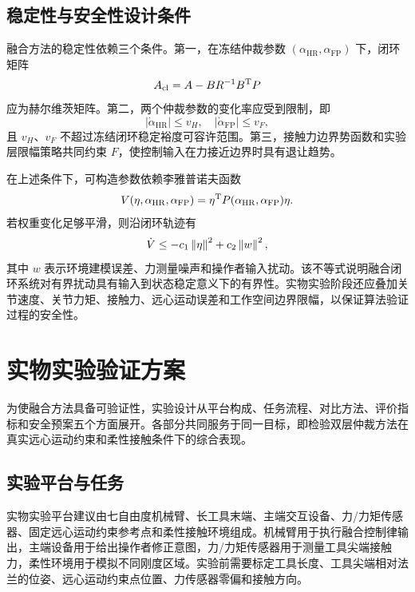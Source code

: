 \subsection{稳定性与安全性设计条件}
\label{sec:ch5_stability_safety}

融合方法的稳定性依赖三个条件。第一，在冻结仲裁参数 $(\alpha_{\mathrm{HR}},\alpha_{\mathrm{FP}})$ 下，闭环矩阵
\begin{equation}
  A_{\mathrm{cl}}=A-BR^{-1}B^{\mathrm{T}}P
  \label{eq:ch5_acl}
\end{equation}
应为赫尔维茨矩阵。第二，两个仲裁参数的变化率应受到限制，即
\begin{equation}
  |\dot\alpha_{\mathrm{HR}}|\le v_H,\quad |\dot\alpha_{\mathrm{FP}}|\le v_F,
  \label{eq:ch5_rate_bound}
\end{equation}
且 $v_H$、$v_F$ 不超过冻结闭环稳定裕度可容许范围。第三，接触力边界势函数和实验层限幅策略共同约束 $F$，使控制输入在力接近边界时具有退让趋势。

在上述条件下，可构造参数依赖李雅普诺夫函数
\begin{equation}
  V(\eta,\alpha_{\mathrm{HR}},\alpha_{\mathrm{FP}})
  =\eta^{\mathrm{T}}P(\alpha_{\mathrm{HR}},\alpha_{\mathrm{FP}})\eta .
  \label{eq:ch5_lyapunov}
\end{equation}
若权重变化足够平滑，则沿闭环轨迹有
\begin{equation}
  \dot V\le -c_1\left\lVert \eta\right\rVert^2+c_2\left\lVert w\right\rVert^2,
  \label{eq:ch5_iss_bound}
\end{equation}
其中 $w$ 表示环境建模误差、力测量噪声和操作者输入扰动。该不等式说明融合闭环系统对有界扰动具有输入到状态稳定意义下的有界性。实物实验阶段还应叠加关节速度、关节力矩、接触力、远心运动误差和工作空间边界限幅，以保证算法验证过程的安全性。

\section{实物实验验证方案}
\label{sec:ch5_real_experiment}

为使融合方法具备可验证性，实验设计从平台构成、任务流程、对比方法、评价指标和安全预案五个方面展开。各部分共同服务于同一目标，即检验双层仲裁方法在真实远心运动约束和柔性接触条件下的综合表现。

\subsection{实验平台与任务}
\label{subsec:ch5_platform}

实物实验平台建议由七自由度机械臂、长工具末端、主端交互设备、力/力矩传感器、固定远心运动约束参考点和柔性接触环境组成。机械臂用于执行融合控制律输出，主端设备用于给出操作者修正意图，力/力矩传感器用于测量工具尖端接触力，柔性环境用于模拟不同刚度区域。实验前需要标定工具长度、工具尖端相对法兰的位姿、远心运动约束点位置、力传感器零偏和接触方向。

